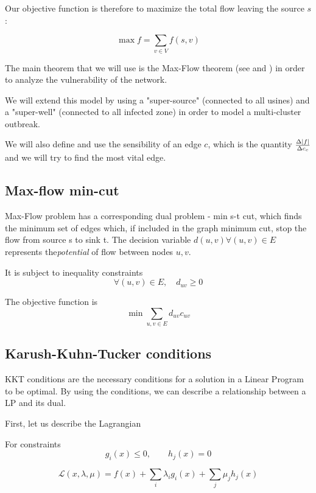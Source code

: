 \documentclass[12pt, openany]{article}
\begin{document}
Our objective function is therefore to maximize the total flow leaving the source $s$:

\begin{equation}
    \max f = \sum_{v \in V} f(s,v)
\end{equation}


The main theorem that we will use is the Max-Flow theorem (see \cite{dantzig1964maxflow} and \cite{wiki_maxflow_mincut}) in order to analyze the vulnerability of the network.

We will extend this model by using a "super-source" (connected to all usines) and a "super-well" (connected to all infected zone) in order to model a multi-cluster outbreak.

We will also define and use the sensibility of an edge $c$, which is the quantity $\frac{\Delta \abs{f}}{\Delta c_c}$ and we will try to find the most vital edge.

\subsection{Max-flow min-cut}
Max-Flow problem has a corresponding dual problem - min s-t cut, which finds the minimum set of edges which, if included in the graph minimum cut, stop the flow from source s to sink t.
The decision variable \( d(u, v) \forall (u, v) \in E \) represents the\textit{potential} of flow between nodes \(u, v\).

It is subject to inequality constraints
\[
    \forall (u, v) \in E, \quad d_{uv} \geq 0
\]

The objective function is
\[
    \min \sum_{u, v \in E} d_{uv}c_{uv}
\]

\subsection{Karush-Kuhn-Tucker conditions}
KKT conditions are the necessary conditions for a solution in a Linear Program to be optimal. By using the conditions, we can describe a relationship between a LP and its dual.

First, let us describe the Lagrangian

For constraints
\[
g_i(x)\le 0,\qquad h_j(x)=0
\]

\[
\mathcal L(x,\lambda,\mu)=f(x)+\sum_i \lambda_i g_i(x)+\sum_j \mu_j h_j(x)
\]
\end{document}
